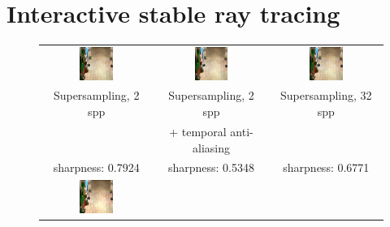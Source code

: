 \section{Interactive stable ray tracing}
\label{sec:srtcontribution}
\begin{figure}[t]
\begin{tabular}{@{}c@{}c@{}@{}c@{}}
	 \includegraphics[width=0.32\textwidth]{figures/ss_2x_rect_370_300_300_300_frame_211.png} &
		 \includegraphics[width=0.32\textwidth]{figures/ss_2x_taa_rect_370_300_300_300_frame_211.png} &
		  \includegraphics[width=0.32\textwidth]{figures/ss_32x_rect_370_300_300_300_frame_211.png} \\	 
Supersampling, 2 spp & Supersampling, 2 spp 	& Supersampling, 32 spp \\
  					 & + temporal anti-aliasing 	&  \\
sharpness: 0.7924 & sharpness: 0.5348 & sharpness: 0.6771  \\
	 \includegraphics[width=0.32\textwidth]{figures/srt_1_rect_370_300_300_300_frame_211.png} &

\end{tabular}
\end{figure}
